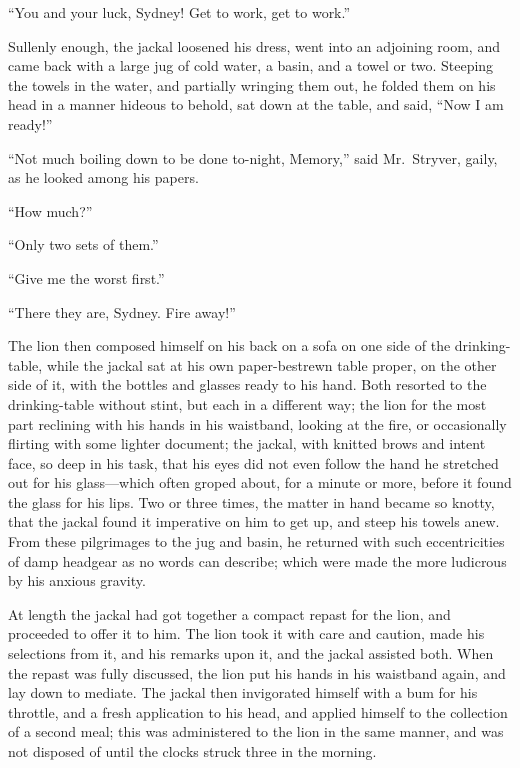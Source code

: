 ``You and your luck, Sydney!  Get to work, get to work.''

Sullenly enough, the jackal loosened his dress, went into an adjoining
room, and came back with a large jug of cold water, a basin, and a towel
or two.  Steeping the towels in the water, and partially wringing them
out, he folded them on his head in a manner hideous to behold, sat down
at the table, and said, ``Now I am ready!''

``Not much boiling down to be done to-night, Memory,'' said Mr.\ Stryver,
gaily, as he looked among his papers.

``How much?''

``Only two sets of them.''

``Give me the worst first.''

``There they are, Sydney.  Fire away!''

The lion then composed himself on his back on a sofa on one side of
the drinking-table, while the jackal sat at his own paper-bestrewn
table proper, on the other side of it, with the bottles and glasses
ready to his hand.  Both resorted to the drinking-table without
stint, but each in a different way; the lion for the most part
reclining with his hands in his waistband, looking at the fire, or
occasionally flirting with some lighter document; the jackal, with
knitted brows and intent face, so deep in his task, that his eyes did
not even follow the hand he stretched out for his glass---which often
groped about, for a minute or more, before it found the glass for his
lips.  Two or three times, the matter in hand became so knotty, that
the jackal found it imperative on him to get up, and steep his towels
anew.  From these pilgrimages to the jug and basin, he returned with
such eccentricities of damp headgear as no words can describe; which
were made the more ludicrous by his anxious gravity.

At length the jackal had got together a compact repast for the lion,
and proceeded to offer it to him.  The lion took it with care and
caution, made his selections from it, and his remarks upon it,
and the jackal assisted both.  When the repast was fully discussed,
the lion put his hands in his waistband again, and lay down to mediate.
The jackal then invigorated himself with a bum for his throttle,
and a fresh application to his head, and applied himself to the
collection of a second meal; this was administered to the lion in the
same manner, and was not disposed of until the clocks struck three in
the morning.

